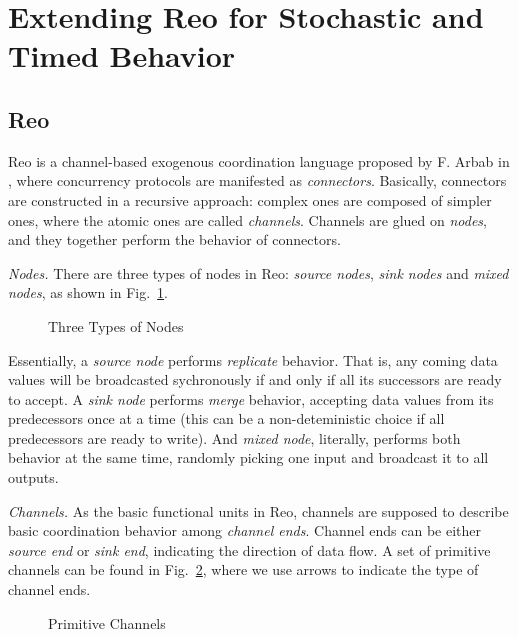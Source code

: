 \section{Extending Reo for Stochastic and Timed Behavior}
\label{sec:reo}

\subsection{Reo}

Reo is a channel-based exogenous coordination language proposed by F. Arbab in \cite{ARBAB2004}, where concurrency protocols are manifested as \emph{connectors}. Basically, connectors are constructed in a recursive approach: complex ones are composed of simpler ones, where the atomic ones are called \emph{channels}. Channels are glued on \emph{nodes}, and they together perform the behavior of connectors.

\vspace{.5em}

\noindent\emph{Nodes.} There are three types of nodes in Reo: \emph{source nodes}, \emph{sink nodes} and \emph{mixed nodes}, as shown in Fig.~\ref{fig:typeofnodes}.

\begin{figure}[H]
    \centering
    
    \caption{Three Types of Nodes}
    \label{fig:typeofnodes}
\end{figure}

Essentially, a \emph{source node} performs \emph{replicate} behavior. That is, any coming data values will be broadcasted sychronously if and only if all its successors are ready to accept. A \emph{sink node} performs \emph{merge} behavior, accepting data values from its predecessors once at a time (this can be a non-deteministic choice if all predecessors are ready to write). And \emph{mixed node}, literally, performs both behavior at the same time, randomly picking one input and broadcast it to all outputs.

\vspace{.5em}
\noindent\emph{Channels.} As the basic functional units in Reo, channels are supposed to describe basic coordination behavior among \emph{channel ends}. Channel ends can be either \emph{source end} or \emph{sink end}, indicating the direction of data flow. A set of primitive channels can be found in Fig.~\ref{fig:basicchannels}, where we use arrows to indicate the type of channel ends.

\begin{figure}[H]
    \centering
    
    \caption{Primitive Channels}
    \label{fig:basicchannels}
\end{figure}

